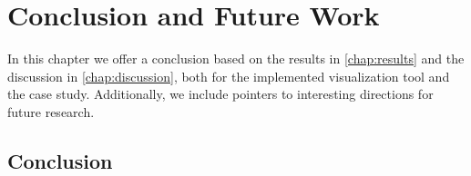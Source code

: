 
\chapter{Conclusion and Future Work}

In this chapter we offer a conclusion based on the results in \autoref{chap:results} and the discussion in \autoref{chap:discussion}, both for the implemented visualization tool and the case study. Additionally, we include pointers to interesting directions for future research.

\section{Conclusion} %






